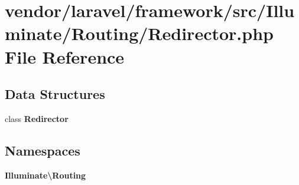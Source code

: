 \section{vendor/laravel/framework/src/\+Illuminate/\+Routing/\+Redirector.php File Reference}
\label{_redirector_8php}
\subsection*{Data Structures}
\begin{DoxyCompactItemize}
\item 
class {\bf Redirector}
\end{DoxyCompactItemize}
\subsection*{Namespaces}
\begin{DoxyCompactItemize}
\item 
 {\bf Illuminate\textbackslash{}\+Routing}
\end{DoxyCompactItemize}
